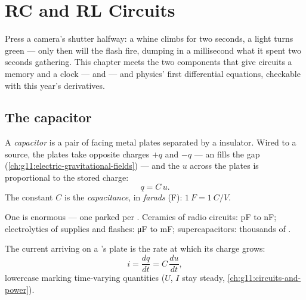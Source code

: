 \chapter{RC and RL Circuits}\label{ch:g12:rc-rl-circuits}

Press a camera's shutter halfway: a  whine climbs for two seconds, a
light turns green --- only then will the flash fire, dumping in a millisecond
what it spent two seconds gathering. This chapter meets the two components
that give circuits a memory and a clock ---  and  --- and
physics' first differential equations, checkable with this year's derivatives.

\section{The capacitor}

\begin{definition}\label{def:g12:rc-rl-circuits:capacitor}
A \emph{capacitor} is a pair of facing metal plates
separated by a  insulator. Wired to a source, the plates take
opposite charges $+q$ and $-q$ --- an  fills the gap
(\cref{ch:g11:electric-gravitational-fields}) --- and the  $u$
across the plates is proportional to the stored charge:
\[ q = C\,u . \]
The constant $C$ is the \emph{capacitance}, in
\emph{farads} (\unit{F}): $\qty{1}{F} = \qty{1}{C/V}$.
\end{definition}

\begin{example}\label{ex:g12:rc-rl-circuits:orders}
One  is enormous --- one  parked per . Ceramics of radio
circuits: \unit{pF} to \unit{nF}; electrolytics of  supplies and
flashes: \unit{\micro F} to \unit{mF}; supercapacitors: thousands of .
\end{example}

\begin{proposition}\label{prop:g12:rc-rl-circuits:cdudt}
The current arriving on a 's plate is the rate at which its
charge grows:
\[
i = \frac{dq}{dt} = C\,\frac{du}{dt} ,
\]
lowercase marking time-varying quantities ($U$, $I$ stay steady,
\cref{ch:g11:circuits-and-power}).
\end{proposition}


